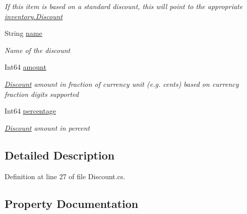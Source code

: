 \begin{DoxyCompactItemize}
\begin{DoxyCompactList}\small\item\em If this item is based on a standard discount, this will point to the appropriate \hyperlink{classcom_1_1clover_1_1sdk_1_1v3_1_1inventory_1_1_discount}{inventory.\+Discount} \end{DoxyCompactList}\item 
String \hyperlink{classcom_1_1clover_1_1sdk_1_1v3_1_1order_1_1_discount_ac69ca30b6c9d052de6ce2354a8fab7c1}{name}
\begin{DoxyCompactList}\small\item\em Name of the discount \end{DoxyCompactList}\item 
Int64 \hyperlink{classcom_1_1clover_1_1sdk_1_1v3_1_1order_1_1_discount_af6d8f69255c4881156507cca3d4fd200}{amount}
\begin{DoxyCompactList}\small\item\em \hyperlink{classcom_1_1clover_1_1sdk_1_1v3_1_1order_1_1_discount}{Discount} amount in fraction of currency unit (e.\+g. cents) based on currency fraction digits supported \end{DoxyCompactList}\item 
Int64 \hyperlink{classcom_1_1clover_1_1sdk_1_1v3_1_1order_1_1_discount_a060312534890beb01ad9cc302ecc141f}{percentage}
\begin{DoxyCompactList}\small\item\em \hyperlink{classcom_1_1clover_1_1sdk_1_1v3_1_1order_1_1_discount}{Discount} amount in percent \end{DoxyCompactList}\end{DoxyCompactItemize}


\subsection{Detailed Description}


Definition at line 27 of file Discount.\+cs.



\subsection{Property Documentation}
\mbox{\label{classcom_1_1clover_1_1sdk_1_1v3_1_1order_1_1_discount_af6d8f69255c4881156507cca3d4fd200}} 
